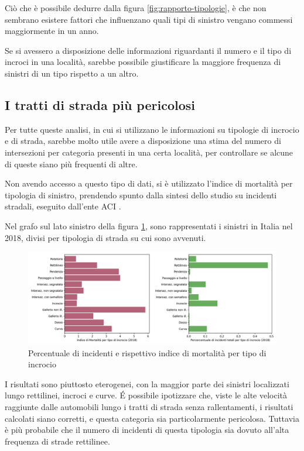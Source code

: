 \documentclass[a4paper,12pt]{report}
\begin{document}
Ciò che è possibile dedurre dalla figura \ref{fig:rapporto-tipologie}, è che non 
sembrano esistere fattori che influenzano quali tipi di sinistro 
vengano commessi maggiormente in un anno. 

Se si avessero a disposizione delle informazioni riguardanti il numero e il tipo 
di incroci in una località, sarebbe possibile giustificare 
la maggiore frequenza di sinistri di un tipo rispetto a un altro. 

\subsection{I tratti di strada più pericolosi}

Per tutte queste analisi, in cui si utilizzano le informazioni su tipologie 
di incrocio e di strada, 
sarebbe molto utile avere a disposizione una stima del numero di intersezioni 
per categoria presenti in una certa località, 
per controllare se alcune di queste siano più frequenti di altre.

Non avendo accesso a questo tipo di dati, si è utilizzato l'indice di 
mortalità per tipologia di sinistro, prendendo spunto dalla sintesi dello 
studio su incidenti stradali, eseguito dall'ente ACI \cite{ACI:2}.

Nel grafo sul lato sinistro della figura \ref{fig:tipo-intersezioni}, 
sono rappresentati i sinistri in Italia nel 2018, divisi per tipologia 
di strada su cui sono avvenuti.

\begin{figure}
    \includegraphics[width=\linewidth]{img_unite/intersezioni_indice_mortalita.png}
    \caption{Percentuale di incidenti e rispettivo indice di mortalità per tipo di incrocio}
    \label{fig:tipo-intersezioni}
\end{figure}

I risultati sono piuttosto eterogenei, con la maggior parte dei sinistri 
localizzati lungo rettilinei, incroci e curve. 
\'E possibile ipotizzare che, viste le alte velocità raggiunte dalle automobili 
lungo i tratti di strada senza rallentamenti, i risultati calcolati siano corretti, 
e questa categoria sia particolarmente pericolosa.
Tuttavia è più probabile che il numero di incidenti di questa tipologia sia dovuto 
all'alta frequenza di strade rettilinee.
\end{document}
